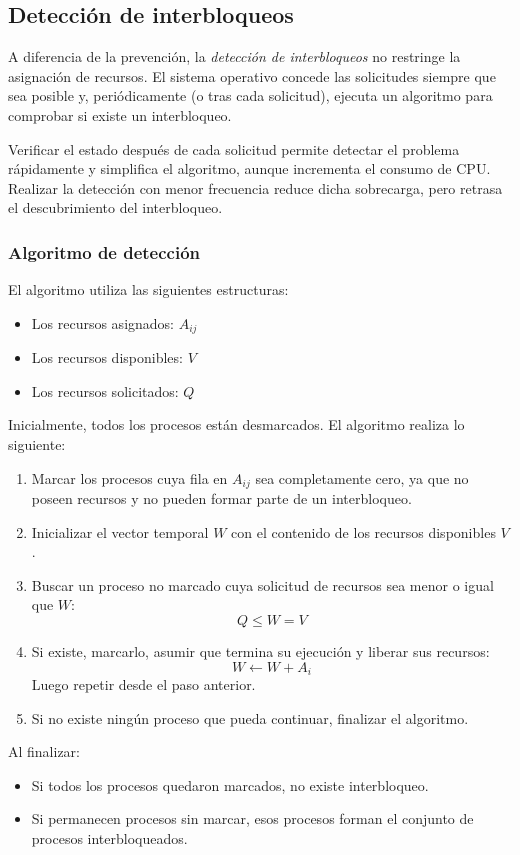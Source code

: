 \subsection{Detección de interbloqueos}

A diferencia de la prevención, la \textit{detección de interbloqueos} no restringe la asignación de recursos. El sistema operativo concede las solicitudes siempre que sea posible y, periódicamente (o tras cada solicitud), ejecuta un algoritmo para comprobar si existe un interbloqueo.

Verificar el estado después de cada solicitud permite detectar el problema rápidamente y simplifica el algoritmo, aunque incrementa el consumo de CPU. Realizar la detección con menor frecuencia reduce dicha sobrecarga, pero retrasa el descubrimiento del interbloqueo.

\subsubsection{Algoritmo de detección}

El algoritmo utiliza las siguientes estructuras:
\begin{itemize}
  \item Los recursos asignados: \(A_{ij}\)
  \item Los recursos disponibles: \(V\)
  \item Los recursos solicitados: \(Q\)
\end{itemize}
Inicialmente, todos los procesos están desmarcados. El algoritmo realiza lo siguiente:
\begin{enumerate}
  \item Marcar los procesos cuya fila en \(A_{ij}\) sea completamente cero, ya que no poseen recursos y no pueden formar parte de un interbloqueo.
  \item Inicializar el vector temporal \(W\) con el contenido de los recursos disponibles \(V\).
  \item Buscar un proceso no marcado cuya solicitud de recursos sea menor o igual que \(W\):
    \[
      Q\leqslant W = V
    \]
  \item Si existe, marcarlo, asumir que termina su ejecución y liberar sus recursos:
  \[
      W \leftarrow W + A_i
  \]
  Luego repetir desde el paso anterior.
  \item Si no existe ningún proceso que pueda continuar, finalizar el algoritmo.
\end{enumerate}
Al finalizar:
\begin{itemize}
  \item Si todos los procesos quedaron marcados, no existe interbloqueo.
  \item Si permanecen procesos sin marcar, esos procesos forman el conjunto de procesos interbloqueados.
\end{itemize}

